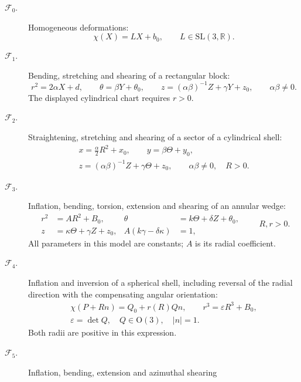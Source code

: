 \documentclass[11pt,a4paper]{article}
\numberwithin{equation}{section}
\theoremstyle{plain}
\theoremstyle{definition}
\theoremstyle{remark}
\begin{document}
\begin{description}
\item[$\mathcal F_0$.] Homogeneous deformations:
\begin{equation}\label{intro:family0}
 \chi(X)=LX+b_0,\qquad L\in\mathrm{SL}(3,\mathbb R).
\end{equation}
\item[$\mathcal F_1$.] Bending, stretching and shearing of a rectangular block:
\begin{equation}\label{intro:family1}
 r^2=2\alpha X+d,\qquad \theta=\beta Y+\theta_0,\qquad
 z=(\alpha\beta)^{-1}Z+\gamma Y+z_0,\qquad \alpha\beta\ne0.
\end{equation}
The displayed cylindrical chart requires $r>0$.
\item[$\mathcal F_2$.] Straightening, stretching and shearing of a sector of a cylindrical shell:
\begin{equation}\label{intro:family2}
 \begin{gathered}
 x=\tfrac\alpha2R^2+x_0,\qquad y=\beta\Theta+y_0,\\
 z=(\alpha\beta)^{-1}Z+\gamma\Theta+z_0,\qquad \alpha\beta\ne0,\quad R>0.
 \end{gathered}
\end{equation}
\item[$\mathcal F_3$.] Inflation, bending, torsion, extension and shearing
of an annular wedge:
\begin{equation}\label{intro:family3}
 \begin{aligned}
 r^2&=AR^2+B_0,&\theta&=k\Theta+\delta Z+\theta_0,\\
 z&=\kappa\Theta+\gamma Z+z_0,& A(k\gamma-\delta\kappa)&=1,
 \end{aligned}\qquad R,r>0.
\end{equation}
All parameters in this model are constants; $A$ is its radial coefficient.
\item[$\mathcal F_4$.] Inflation and inversion of a spherical shell,
including reversal of the
radial direction with the compensating angular orientation:
\begin{equation}\label{intro:family4}
 \begin{gathered}
 \chi(P+Rn)=Q_0+r(R)Qn,\qquad r^3=\varepsilon R^3+B_0,\\
 \varepsilon=\det Q,\quad Q\in\mathrm O(3),\quad |n|=1.
 \end{gathered}
\end{equation}
Both radii are positive in this expression.
\item[$\mathcal F_5$.] Inflation, bending, extension and azimuthal shearing

\end{description}
\end{document}
